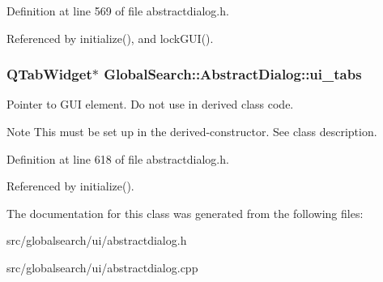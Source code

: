 Definition at line 569 of file abstractdialog.\-h.



Referenced by initialize(), and lock\-G\-U\-I().

\hypertarget{classGlobalSearch_1_1AbstractDialog_acc93d22a99eb7c11610494ce754b1502}{
\subsubsection[{ui\-\_\-tabs}]{\setlength{\rightskip}{0pt plus 5cm}Q\-Tab\-Widget$\ast$ Global\-Search\-::\-Abstract\-Dialog\-::ui\-\_\-tabs\hspace{0.3cm}{\ttfamily [protected]}}}\label{classGlobalSearch_1_1AbstractDialog_acc93d22a99eb7c11610494ce754b1502}
Pointer to G\-U\-I element. Do not use in derived class code. \begin{DoxyNote}{Note}
This must be set up in the derived-\/constructor. See class description. 
\end{DoxyNote}


Definition at line 618 of file abstractdialog.\-h.



Referenced by initialize().



The documentation for this class was generated from the following files\-:\begin{DoxyCompactItemize}
\item 
src/globalsearch/ui/abstractdialog.\-h\item 
src/globalsearch/ui/abstractdialog.\-cpp\end{DoxyCompactItemize}
